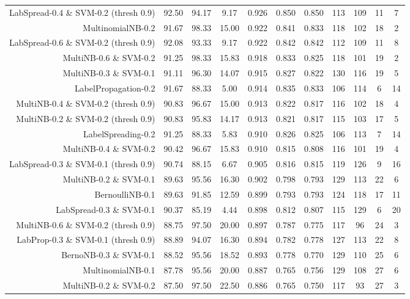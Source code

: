 \begin{table}[!htb]
\begin{tabular}{r|c|c|c|c|c|c|c|c|c|c}
LabSpread-0.4 \& SVM-0.2 (thresh 0.9) & 92.50 & 94.17 & 9.17 & 0.926 & 0.850 & 0.850 & 113 & 109 & 11 & 7 \\ 
MultinomialNB-0.2 & 91.67 & 98.33 & 15.00 & 0.922 & 0.841 & 0.833 & 118 & 102 & 18 & 2 \\ 
LabSpread-0.6 \& SVM-0.2 (thresh 0.9) & 92.08 & 93.33 & 9.17 & 0.922 & 0.842 & 0.842 & 112 & 109 & 11 & 8 \\ 
MultiNB-0.6 \& SVM-0.2 & 91.25 & 98.33 & 15.83 & 0.918 & 0.833 & 0.825 & 118 & 101 & 19 & 2 \\ 
MultiNB-0.3 \& SVM-0.1 & 91.11 & 96.30 & 14.07 & 0.915 & 0.827 & 0.822 & 130 & 116 & 19 & 5 \\ 
LabelPropagation-0.2 & 91.67 & 88.33 & 5.00 & 0.914 & 0.835 & 0.833 & 106 & 114 & 6 & 14 \\ 
MultiNB-0.4 \& SVM-0.2 (thresh 0.9) & 90.83 & 96.67 & 15.00 & 0.913 & 0.822 & 0.817 & 116 & 102 & 18 & 4 \\ 
MultiNB-0.2 \& SVM-0.2 (thresh 0.9) & 90.83 & 95.83 & 14.17 & 0.913 & 0.821 & 0.817 & 115 & 103 & 17 & 5 \\ 
LabelSpreading-0.2 & 91.25 & 88.33 & 5.83 & 0.910 & 0.826 & 0.825 & 106 & 113 & 7 & 14 \\ 
MultiNB-0.4 \& SVM-0.2 & 90.42 & 96.67 & 15.83 & 0.910 & 0.815 & 0.808 & 116 & 101 & 19 & 4 \\ 
LabSpread-0.3 \& SVM-0.1 (thresh 0.9) & 90.74 & 88.15 & 6.67 & 0.905 & 0.816 & 0.815 & 119 & 126 & 9 & 16 \\ 
MultiNB-0.2 \& SVM-0.1 & 89.63 & 95.56 & 16.30 & 0.902 & 0.798 & 0.793 & 129 & 113 & 22 & 6 \\ 
BernoulliNB-0.1 & 89.63 & 91.85 & 12.59 & 0.899 & 0.793 & 0.793 & 124 & 118 & 17 & 11 \\ 
LabSpread-0.3 \& SVM-0.1 & 90.37 & 85.19 & 4.44 & 0.898 & 0.812 & 0.807 & 115 & 129 & 6 & 20 \\ 
MultiNB-0.6 \& SVM-0.2 (thresh 0.9) & 88.75 & 97.50 & 20.00 & 0.897 & 0.787 & 0.775 & 117 & 96 & 24 & 3 \\ 
LabProp-0.3 \& SVM-0.1 (thresh 0.9) & 88.89 & 94.07 & 16.30 & 0.894 & 0.782 & 0.778 & 127 & 113 & 22 & 8 \\ 
BernoNB-0.3 \& SVM-0.1 & 88.52 & 95.56 & 18.52 & 0.893 & 0.778 & 0.770 & 129 & 110 & 25 & 6 \\ 
MultinomialNB-0.1 & 87.78 & 95.56 & 20.00 & 0.887 & 0.765 & 0.756 & 129 & 108 & 27 & 6 \\ 
MultiNB-0.2 \& SVM-0.2 & 87.50 & 97.50 & 22.50 & 0.886 & 0.765 & 0.750 & 117 & 93 & 27 & 3 \\ 

\end{tabular}
\end{table}
